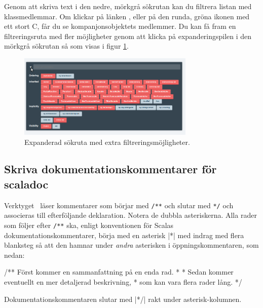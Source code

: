 Genom att skriva text i den nedre, mörkgrå sökrutan kan du filtrera listan med klassmedlemmar. Om klickar på länken , eller på den runda, gröna ikonen med ett stort C, får du se kompanjonsobjektets medlemmer.
Du kan få fram en filtreringsruta med fler möjligheter genom att klicka på expanderingspilen i den mörkgrå sökrutan så som visas i figur \ref{fig:scaladoc:filter}.



\begin{figure}[H]
\centering
\includegraphics[width=0.75\textwidth]{../img/scaladoc/scaladoc-filter}

     \caption{Expanderad sökruta med extra filtreringsmöjligheter.}
    \label{fig:scaladoc:filter}
\end{figure}


\clearpage

\subsection{Skriva dokumentationskommentarer för scaladoc}


Verktyget \scaladoc\ läser kommentarer som börjar med \verb|/**| och slutar med \verb|*/| och associeras till efterföljande deklaration. Notera de dubbla asteriskerna. Alla rader som följer efter \verb|/**| ska, enligt konventionen för Scalas dokumentationskommentarer, börja med en asterisk \code|*| med indrag med flera blanksteg så att den hamnar under \textit{andra} asterisken i öppningskommentaren, som nedan:
\begin{Code}
/** Först kommer en sammanfattning på en enda rad.
  *
  * Sedan kommer eventuellt en mer detaljerad beskrivning,
  * som kan vara flera rader lång.
  */
\end{Code}
Dokumentationskommentaren slutar med \code|*/| rakt under asterisk-kolumnen.

